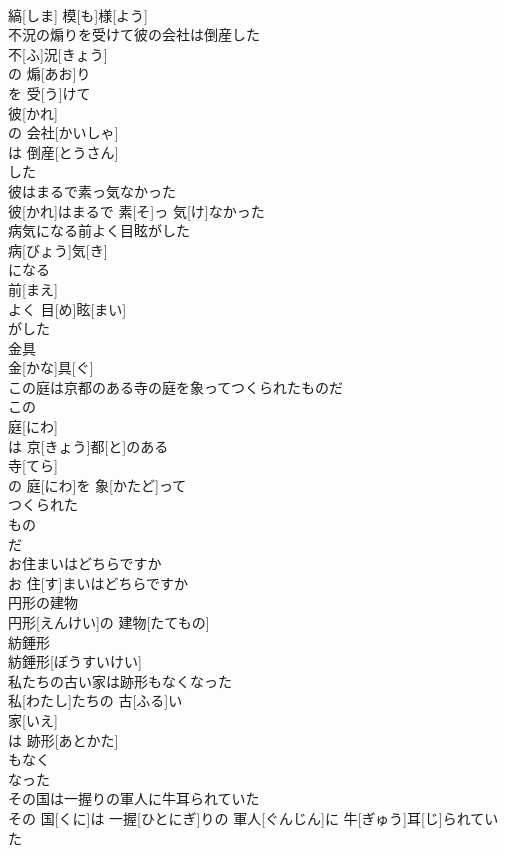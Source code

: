 \documentclass[8pt]{extreport}
\begin{document}
\begin{CJK}{UTF8}{min}
\\	縞[しま] 模[も]様[よう]
\\	不況の煽りを受けて彼の会社は倒産した	
\\	不[ふ]況[きょう]
\\	の 煽[あお]り 
\\	を 受[う]けて 
\\	彼[かれ]
\\	の 会社[かいしゃ]
\\	は 倒産[とうさん]
\\	した
\\	彼はまるで素っ気なかった	
\\	彼[かれ]はまるで 素[そ]っ 気[け]なかった
\\	病気になる前よく目眩がした	
\\	病[びょう]気[き]
\\	になる 
\\	前[まえ]
\\	よく 目[め]眩[まい]
\\	がした
\\	金具	
\\	金[かな]具[ぐ]
\\	この庭は京都のある寺の庭を象ってつくられたものだ	
\\	この 
\\	庭[にわ]
\\	は 京[きょう]都[と]のある 
\\	寺[てら]
\\	の 庭[にわ]を 象[かたど]って 
\\	つくられた 
\\	もの 
\\	だ
\\	お住まいはどちらですか	
\\	お 住[す]まいはどちらですか
\\	円形の建物	
\\	円形[えんけい]の 建物[たてもの]
\\	紡錘形	
\\	紡錘形[ぼうすいけい]
\\	私たちの古い家は跡形もなくなった	
\\	私[わたし]たちの 古[ふる]い 
\\	家[いえ]
\\	は 跡形[あとかた]
\\	もなく 
\\	なった 
\\	その国は一握りの軍人に牛耳られていた	
\\	その 国[くに]は 一握[ひとにぎ]りの 軍人[ぐんじん]に 牛[ぎゅう]耳[じ]られていた

\end{CJK}
\end{document}
